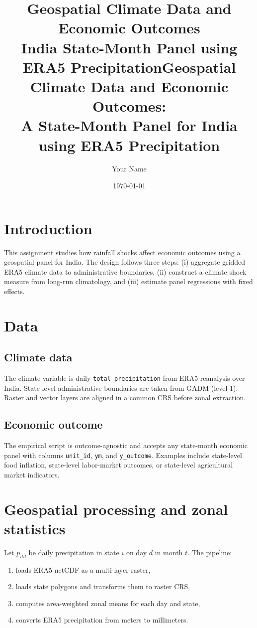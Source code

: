 \documentclass[11pt]{article}
\title{Geospatial Climate Data and Economic Outcomes\\
India State-Month Panel using ERA5 Precipitation}
\title{Geospatial Climate Data and Economic Outcomes: \\
A State-Month Panel for India using ERA5 Precipitation}
\author{Your Name}
\date{\today}
\begin{document}
\maketitle

\section{Introduction}
This assignment studies how rainfall shocks affect economic outcomes using a geospatial panel for
India. The design follows three steps: (i) aggregate gridded ERA5 climate data to administrative
boundaries, (ii) construct a climate shock measure from long-run climatology, and (iii) estimate
panel regressions with fixed effects.

\section{Data}
\subsection{Climate data}
The climate variable is daily \texttt{total\_precipitation} from ERA5 reanalysis over India.
State-level administrative boundaries are taken from GADM (level-1). Raster and vector layers are
aligned in a common CRS before zonal extraction.

\subsection{Economic outcome}
The empirical script is outcome-agnostic and accepts any state-month economic panel with columns
\texttt{unit\_id}, \texttt{ym}, and \texttt{y\_outcome}. Examples include state-level food inflation,
state-level labor-market outcomes, or state-level agricultural market indicators.

\section{Geospatial processing and zonal statistics}
Let $p_{itd}$ be daily precipitation in state $i$ on day $d$ in month $t$.
The pipeline:
\begin{enumerate}
  \item loads ERA5 netCDF as a multi-layer raster,
  \item loads state polygons and transforms them to raster CRS,
  \item computes area-weighted zonal means for each day and state,
  \item converts ERA5 precipitation from meters to millimeters.
\end{enumerate}
\end{document}
